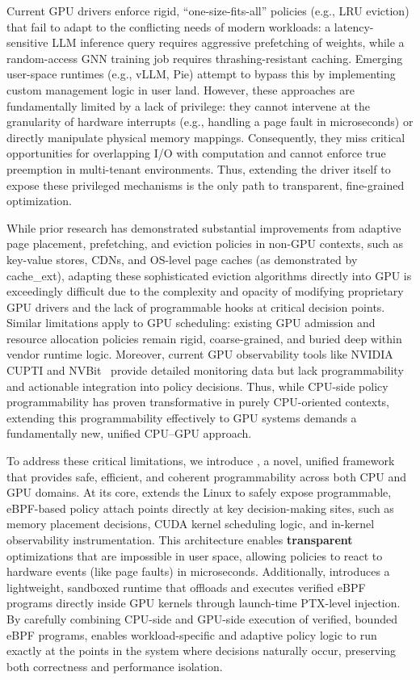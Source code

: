 Current GPU drivers enforce rigid, ``one-size-fits-all'' policies (e.g., LRU eviction) that fail to adapt to the conflicting needs of modern workloads: a latency-sensitive LLM inference query requires aggressive prefetching of weights, while a random-access GNN training job requires thrashing-resistant caching. Emerging user-space runtimes (e.g., vLLM, Pie) attempt to bypass this by implementing custom management logic in user land. However, these approaches are fundamentally limited by a lack of privilege: they cannot intervene at the granularity of hardware interrupts (e.g., handling a page fault in microseconds) or directly manipulate physical memory mappings. Consequently, they miss critical opportunities for overlapping I/O with computation and cannot enforce true preemption in multi-tenant environments. Thus, extending the driver itself to expose these privileged mechanisms is the only path to transparent, fine-grained optimization.

While prior research has demonstrated substantial improvements from adaptive page placement, prefetching, and eviction policies in non-GPU contexts, such as key-value stores, CDNs, and OS-level page caches (as demonstrated by cache\_ext), adapting these sophisticated eviction algorithms directly into GPU is exceedingly difficult due to the complexity and opacity of modifying proprietary GPU drivers and the lack of programmable hooks at critical decision points. Similar limitations apply to GPU scheduling: existing GPU admission and resource allocation policies remain rigid, coarse-grained, and buried deep within vendor runtime logic. Moreover, current GPU observability tools like NVIDIA CUPTI and NVBit~\cite{cupti,villa2019nvbit} provide detailed monitoring data but lack programmability and actionable integration into policy decisions. Thus, while CPU-side policy programmability has proven transformative in purely CPU-oriented contexts, extending this programmability effectively to GPU systems demands a fundamentally new, unified CPU--GPU approach.


To address these critical limitations, we introduce \sys, a novel, unified framework that provides safe, efficient, and coherent programmability across both CPU and GPU domains. At its core, \sys extends the Linux \sysdriver to safely expose programmable, eBPF-based policy attach points directly at key decision-making sites, such as memory placement decisions, CUDA kernel scheduling logic, and in-kernel observability instrumentation. This architecture enables \textbf{transparent} optimizations that are impossible in user space, allowing policies to react to hardware events (like page faults) in microseconds. Additionally, \sys introduces a lightweight, sandboxed runtime that offloads and executes verified eBPF programs directly inside GPU kernels through launch-time PTX-level injection. By carefully combining CPU-side and GPU-side execution of verified, bounded eBPF programs, \sys enables workload-specific and adaptive policy logic to run exactly at the points in the system where decisions naturally occur, preserving both correctness and performance isolation.

